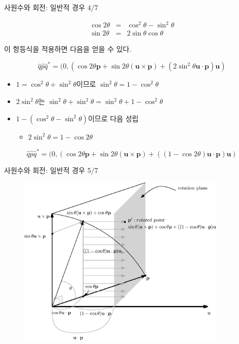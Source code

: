 \begin{frame}[fragile]{사원수와 회전: 일반적 경우 4/7}

\begin{eqnarray}\nonumber
\cos 2 \theta  & = & \cos^2 \theta - \sin^2 \theta \\ \nonumber
\sin 2 \theta & = & 2 \sin \theta \cos \theta \nonumber
\end{eqnarray}

이 항등식을 적용하면 다음을 얻을 수 있다.

$$\hat q \hat p \hat q^* =  ( 0, (\cos 2\theta \mathbf p + \sin 2 \theta (\mathbf u \times \mathbf p) + (2 \sin^2 \theta \mathbf u \cdot \mathbf p) \mathbf u)$$

\begin{itemize}
\item $1=\cos^2 \theta + \sin^2 \theta$이므로 $\sin^2 \theta = 1 - \cos^2 \theta$
\item $2\sin^2 \theta$는 $\sin^2 \theta + \sin^2 \theta = \sin^2 \theta + 1 - \cos^2 \theta$
\item $1 - (\cos^2 \theta - \sin^2 \theta)$이므로 다음 성립
	\begin{itemize}
	\item $2 \sin^2 \theta = 1 - \cos 2 \theta$
	\end{itemize}
\end{itemize}

$$\hat q \hat p \hat q^* =  ( 0, (\cos 2\theta \mathbf p + \sin 2 \theta (\mathbf u \times \mathbf p) + ((1-\cos 2 \theta) \mathbf u \cdot \mathbf p) \mathbf u)$$

\end{frame}

\begin{frame}[fragile]{사원수와 회전: 일반적 경우 5/7}

\begin{figure}
    \includegraphics[width=10cm]{Math_quaternion/quaternionRotation.eps}
\end{figure}

\end{frame}

